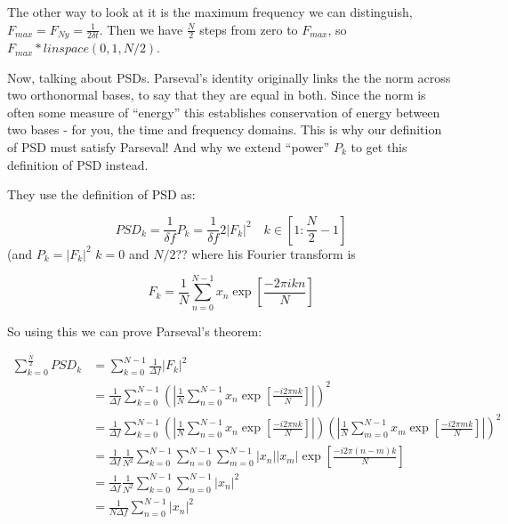 \documentclass[11pt]{article}
\begin{document}
The other way to look at it is the maximum frequency we can distinguish, $F_{max} = F_{Ny} =
\frac{1}{2 \delta t}$. Then we have $\frac{N}{2}$ steps from zero to $F_{max}$, so $F_{max} *
linspace(0,1,N/2)$.

Now, talking about PSDs. Parseval's identity originally links the the norm across two orthonormal
bases, to say that they are equal in both. Since the norm is often some measure of ``energy'' this
establishes conservation of energy between two bases - for you, the time and frequency domains. This
is why our definition of PSD must satisfy Parseval! And why we extend ``power'' $P_k$ to get this
definition of PSD instead.

They use the definition of PSD as:

\begin{equation}
    PSD_k = \frac{1}{\delta f} P_k = \frac{1}{\delta f} 2 \left| F_k \right|^2 \quad k \in \left[ 1
    : \frac{N}{2} - 1 \right]
\end{equation}
(and $P_k =  \left| F_k \right|^2$ $k=0$ and $N/2$??
where his Fourier transform is 

\begin{equation}
    F_k = \frac{1}{N} \sum_{n=0}^{N-1} x_n \exp{\left[\frac{- 2\pi i kn}{N} \right]}
\end{equation}

So using this we can prove Parseval's theorem:

\begin{align}
    \sum_{k=0}^{\frac{N}{2}} PSD_k &= \sum_{k=0}^{N-1} \frac{1}{\Delta f} \left| F_k \right|^2 \\
    &= \frac{1}{\Delta f} \sum_{k=0}^{N-1} \left( \left| \frac{1}{N} \sum_{n=0}^{N-1} x_n \exp{\left[
    \frac{-i 2 \pi nk}{N} \right]} \right| \right)^2 \\
    &= \frac{1}{\Delta f} \sum_{k=0}^{N-1} \left( \left| \frac{1}{N} \sum_{n=0}^{N-1} x_n \exp{\left[
    \frac{-i 2 \pi nk}{N} \right]} \right| \right) \left( \left| \frac{1}{N} \sum_{m=0}^{N-1} x_m \exp{\left[
    \frac{-i 2 \pi mk}{N} \right]} \right| \right)^2  \\
    &= \frac{1}{\Delta f} \frac{1}{N^2} \sum_{k=0}^{N-1} \sum_{n=0}^{N-1} \sum_{m=0}^{N-1} \left|
    x_n \right| \left| x_m \right| \exp{\left[\frac{-i 2 \pi (n-m) k}{N} \right]} \\
    &= \frac{1}{\Delta f} \frac{1}{N^2} \sum_{k=0}^{N-1} \sum_{n=0}^{N-1} \left| x_n \right|^2 \\
    &= \frac{1}{N \Delta f} \sum_{n=0}^{N-1} \left| x_n \right|^2
\end{align}
\end{document}
